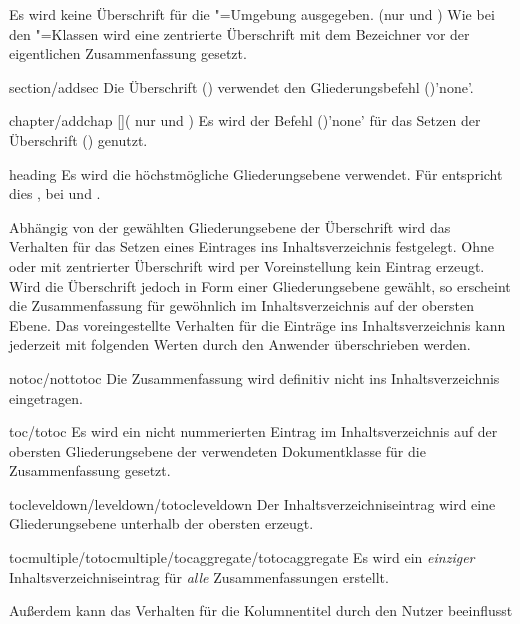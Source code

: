 \begin{Declaration*}{}
\begin{Declaration*}{}
\begin{Declaration*}{}
\begin{Declaration}[%
  v2.02!\Option{abstract=multiple}:ersetzt \Option{abstract=double};%
  v2.02!\Option{abstract=tocleveldown};%
  v2.02!\Option{abstract=markboth};%
  v2.04!\Option{abstract=tocmultiple}%
]{}
\begin{values}{}
  Es wird keine Überschrift für die "=Umgebung ausgegeben.
\itemtrue*(nur  und )
  Wie bei den \KOMAScript"=Klassen wird eine zentrierte Überschrift mit dem 
  Bezeichner  vor der eigentlichen Zusammenfassung gesetzt.
\item[section/addsec]
  Die Überschrift () verwendet den Gliederungsbefehl 
  ()'none'.
\item[chapter/addchap][\Class{tudscrbook}](%
    nur  und %
  )
  Es wird der Befehl ()'none' für das 
  Setzen der Überschrift () genutzt. 
\item[heading]
  Es wird die höchstmögliche Gliederungsebene verwendet. Für 
   entspricht dies , bei 
   und  .
\end{values}
%
Abhängig von der gewählten Gliederungsebene der Überschrift wird das Verhalten 
für das Setzen eines Eintrages ins Inhaltsverzeichnis festgelegt. Ohne oder mit 
zentrierter Überschrift wird per Voreinstellung kein Eintrag erzeugt. Wird die 
Überschrift jedoch in Form einer Gliederungsebene gewählt, so erscheint die 
Zusammenfassung für gewöhnlich im Inhaltsverzeichnis auf der obersten Ebene. 
Das voreingestellte Verhalten für die Einträge ins Inhaltsverzeichnis kann 
jederzeit mit folgenden Werten durch den Anwender überschrieben werden.
%
\begin{values}{}
\item[notoc/nottotoc]
  Die Zusammenfassung wird definitiv nicht ins Inhaltsverzeichnis eingetragen.
\item[toc/totoc]
  Es wird ein nicht nummerierten Eintrag im Inhaltsverzeichnis auf der obersten 
  Gliederungsebene der verwendeten Dokumentklasse für die Zusammenfassung 
  gesetzt.
\item[tocleveldown/leveldown/totocleveldown]
  Der Inhaltsverzeichniseintrag wird eine Gliederungsebene unterhalb der 
  obersten erzeugt.
\item[tocmultiple/totocmultiple/tocaggregate/totocaggregate]
  Es wird ein \emph{einziger} Inhaltsverzeichniseintrag für \emph{alle} 
  Zusammenfassungen erstellt.
\end{values}
%
Außerdem kann das Verhalten für die Kolumnentitel durch den Nutzer beeinflusst 

\end{Declaration}
\end{Declaration*}
\end{Declaration*}
\end{Declaration*}
